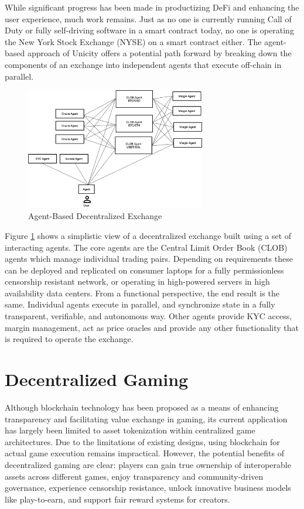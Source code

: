 \documentclass{article}
\begin{document}
While significant progress has been made in productizing DeFi and enhancing the user experience, much work remains. Just as no one is currently running Call of Duty or fully self-driving software in a smart contract today, no one is operating the New York Stock Exchange (NYSE) on a smart contract either. The agent-based approach of Unicity offers a potential path forward by breaking down the components of an exchange into independent agents that execute off-chain in parallel.

\begin{figure}[H]
    \centering
    \includegraphics[width=0.7\textwidth]{ABEX.png}
    \caption{Agent-Based Decentralized Exchange}
    \label{fig:ABEX}
\end{figure}


Figure \ref{fig:ABEX} shows a simplistic view of a decentralized exchange built using a set of interacting agents. The core agents are the Central Limit Order Book (CLOB) agents which manage individual trading pairs. Depending on requirements these can be deployed and replicated on consumer laptops for a fully permissionless censorship resistant network, or operating in high-powered servers in high availability data centers. From a functional perspective, the end result is the same. Individual agents execute in parallel, and synchronize state in a fully transparent, verifiable, and autonomous way. Other agents provide KYC access, margin management, act as price oracles and provide any other functionality that is required to operate the exchange.


\section{Decentralized Gaming}

Although blockchain technology has been proposed as a means of enhancing transparency and facilitating value exchange in gaming, its current application has largely been limited to asset tokenization within centralized game architectures. Due to the limitations of existing designs, using blockchain for actual game execution remains impractical. However, the potential benefits of decentralized gaming are clear: players can gain true ownership of interoperable assets across different games, enjoy transparency and community-driven governance, experience censorship resistance, unlock innovative business models like play-to-earn, and support fair reward systems for creators.
\end{document}
